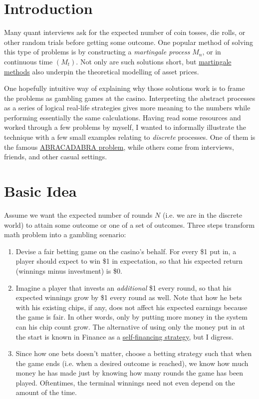 \documentclass[11pt]{article}
\begin{document}
\section*{Introduction}
Many quant interviews ask for the expected number of coin tosses, die rolls, or other random trials before getting some outcome. One popular method of solving this type of problems is by constructing a \emph{martingale process} $M_n$, or in continuous time $(M_t)$. Not only are such solutions short, but \href{https://www.quantstart.com/articles/The-Markov-and-Martingale-Properties/}{martingale methods} also underpin the theoretical modelling of asset prices.

One hopefully intuitive way of explaining why those solutions work is to frame the problems as gambling games at the casino. Interpreting the abstract processes as a series of logical real-life strategies gives more meaning to the numbers while performing essentially the same calculations. Having read some resources and worked through a few problems by myself, I wanted to informally illustrate the technique with a few small examples relating to \emph{discrete} processes. One of them is the famous \href{https://martingalemeasure.wordpress.com/2014/02/02/monkey-typing-abracadabra-14/}{ABRACADABRA problem}, while others come from interviews, friends, and other casual settings.


\tableofcontents
\newpage

\section{Basic Idea}
Assume we want the expected number of rounds $N$ (i.e. we are in the discrete world) to attain some outcome or one of a set of outcomes. Three steps transform math problem into a gambling scenario:

\begin{enumerate}
\item Devise a fair betting game on the casino's behalf. For every \$1 put in, a player should expect to win \$1 in expectation, so that his expected return (winnings minus investment) is \$0. 
\item Imagine a player that invests an \emph{additional} \$1 every round, so that his expected winnings grow by \$1 every round as well. Note that how he bets with his existing chips, if any, does not affect his expected earnings because the game is fair. In other words, only by putting more money in the system can his chip count grow. The alternative of using only the money put in at the start is known in Finance as a \href{https://math.stackexchange.com/questions/1828876/definition-of-self-financing-strategy}{self-financing strategy}, but I digress.
\item Since how one bets doesn't matter, choose a betting strategy such that when the game ends (i.e. when a desired outcome is reached), we know how much money he has made just by knowing how many rounds the game has been played. Oftentimes, the terminal winnings need not even depend on the amount of the time.
\end{enumerate}
\end{document}

